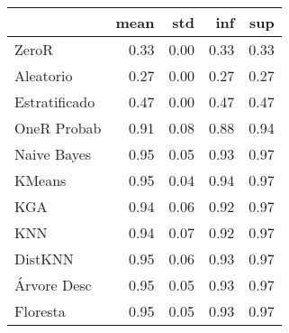 \begin{table}
\centering
\label{Iris_status_table}
\begin{tabular}{lrrrr}
\toprule
{} &  mean &  std &  inf &  sup \\
\midrule
ZeroR         &  0.33 & 0.00 & 0.33 & 0.33 \\
Aleatorio     &  0.27 & 0.00 & 0.27 & 0.27 \\
Estratificado &  0.47 & 0.00 & 0.47 & 0.47 \\
OneR Probab   &  0.91 & 0.08 & 0.88 & 0.94 \\
Naive Bayes   &  0.95 & 0.05 & 0.93 & 0.97 \\
KMeans        &  0.95 & 0.04 & 0.94 & 0.97 \\
KGA           &  0.94 & 0.06 & 0.92 & 0.97 \\
KNN           &  0.94 & 0.07 & 0.92 & 0.97 \\
DistKNN       &  0.95 & 0.06 & 0.93 & 0.97 \\
Árvore Desc   &  0.95 & 0.05 & 0.93 & 0.97 \\
Floresta      &  0.95 & 0.05 & 0.93 & 0.97 \\
\bottomrule
\end{tabular}
\end{table}
